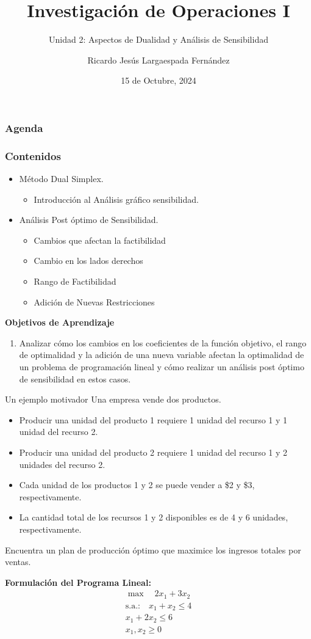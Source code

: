 \documentclass{beamer}
\title{Investigación de Operaciones I}
\subtitle{Unidad 2: Aspectos de Dualidad y Análisis de Sensibilidad}
\author[Ricardo Largaespada]{Ricardo Jesús Largaespada Fernández}
\institute[UNI]{Ingeniería de Sistemas, DACTIC, UNI}
\date{15 de Octubre, 2024}
\begin{document}
\frame{\titlepage}

\begin{frame}
\frametitle{Agenda}
\tableofcontents
\end{frame}

\begin{frame}
\frametitle{Contenidos}
\begin{itemize}
\item Método Dual Simplex.
\begin{itemize}
\item Introducción al Análisis gráfico sensibilidad.
\end{itemize}
\item Análisis Post óptimo de Sensibilidad.
\begin{itemize}
\item Cambios que afectan la factibilidad
\item Cambio en los lados derechos
\item Rango de Factibilidad
\item Adición de Nuevas Restricciones
\end{itemize}
\end{itemize}

\pause
\textbf{Objetivos de Aprendizaje}
    \begin{enumerate}
        \item Analizar cómo los cambios en los coeficientes de la función objetivo, el rango de optimalidad y la adición de una nueva variable afectan la optimalidad de un problema de programación lineal y cómo realizar un análisis post óptimo de sensibilidad en estos casos.
    \end{enumerate}
\end{frame}

\begin{frame}{Un ejemplo motivador}
Una empresa vende dos productos.
\begin{itemize}
    \item Producir una unidad del producto 1 requiere 1 unidad del recurso 1 y 1 unidad del recurso 2.
    \item Producir una unidad del producto 2 requiere 1 unidad del recurso 1 y 2 unidades del recurso 2.
    \item Cada unidad de los productos 1 y 2 se puede vender a \$2 y \$3, respectivamente.
    \item La cantidad total de los recursos 1 y 2 disponibles es de 4 y 6 unidades, respectivamente.
\end{itemize}
Encuentra un plan de producción óptimo que maximice los ingresos totales por ventas.

\textbf{Formulación del Programa Lineal:}
\begin{align*}
\max \quad 2x_1 + 3x_2\\
\text{s.a.:} \quad x_1 + x_2 \leq 4\\
x_1 + 2x_2 \leq 6\\
x_1, x_2 \geq 0
\end{align*}

\end{frame}
\end{document}
